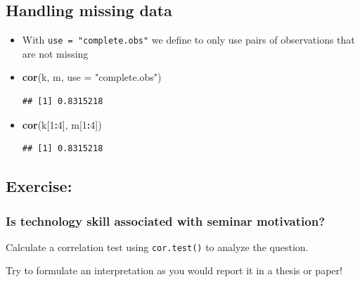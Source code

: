 \documentclass[
]{book}
\newenvironment{Shaded}{\begin{snugshade}}{\end{snugshade}}
\newcommand{\AttributeTok}[1]{\textcolor[rgb]{0.13,0.29,0.53}{#1}}
\newcommand{\DecValTok}[1]{\textcolor[rgb]{0.00,0.00,0.81}{#1}}
\newcommand{\FunctionTok}[1]{\textcolor[rgb]{0.13,0.29,0.53}{\textbf{#1}}}
\newcommand{\NormalTok}[1]{#1}
\newcommand{\SpecialCharTok}[1]{\textcolor[rgb]{0.81,0.36,0.00}{\textbf{#1}}}
\newcommand{\StringTok}[1]{\textcolor[rgb]{0.31,0.60,0.02}{#1}}
\begin{document}
\subsection{Handling missing data}\label{handling-missing-data-1}

\begin{itemize}
\item
  With \texttt{use\ =\ "complete.obs"} we define to only use pairs of observations that are not missing
\item
\begin{Shaded}
\begin{Highlighting}[]
\FunctionTok{cor}\NormalTok{(k, m, }\AttributeTok{use =} \StringTok{"complete.obs"}\NormalTok{)}
\end{Highlighting}
\end{Shaded}

\begin{verbatim}
## [1] 0.8315218
\end{verbatim}
\item
\begin{Shaded}
\begin{Highlighting}[]
\FunctionTok{cor}\NormalTok{(k[}\DecValTok{1}\SpecialCharTok{:}\DecValTok{4}\NormalTok{], m[}\DecValTok{1}\SpecialCharTok{:}\DecValTok{4}\NormalTok{])}
\end{Highlighting}
\end{Shaded}

\begin{verbatim}
## [1] 0.8315218
\end{verbatim}
\end{itemize}

\subsection{Exercise:}\label{exercise-8}

\subsubsection{\texorpdfstring{Is technology skill associated with seminar motivation? }{Is technology skill associated with seminar motivation?  }}\label{is-technology-skill-associated-with-seminar-motivation}

Calculate a correlation test using \texttt{cor.test()} to analyze the question.

Try to formulate an interpretation as you would report it in a thesis or paper!
\end{document}
